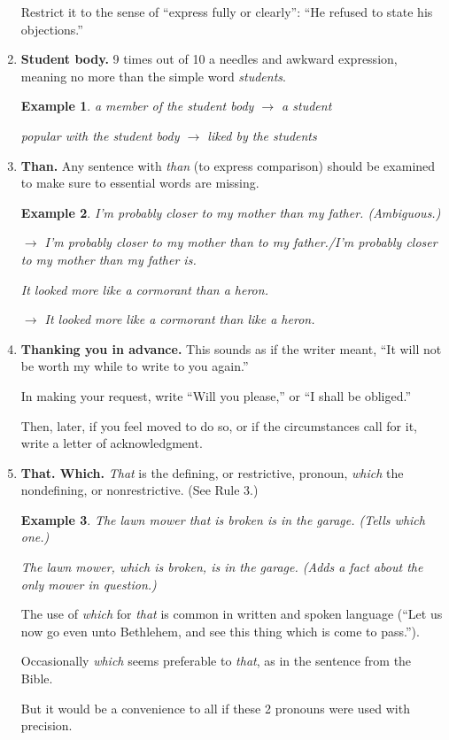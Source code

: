 \documentclass{article}
\newtheorem{example}{Example}
\begin{document}
\begin{enumerate}
	Restrict it to the sense of ``express fully or clearly'': ``He refused to state his objections.''
	\item {\bf Student body.} 9 times out of 10 a needles and awkward expression, meaning no more than the simple word {\it students}.
	\begin{example}
		a member of the student body $\to$ a student
		
		popular with the student body $\to$ liked by the students
	\end{example}
	\item {\bf Than.} Any sentence with {\it than} (to express comparison) should be examined to make sure to essential words are missing.
	\begin{example}
		I'm probably closer to my mother than my father. (Ambiguous.)
		
		$\to$ I'm probably closer to my mother than to my father./I'm probably closer to my mother than my father is.
		
		It looked more like a cormorant than a heron.
		
		$\to$ It looked more like a cormorant than like a heron.
	\end{example}
	\item {\bf Thanking you in advance.} This sounds as if the writer meant, ``It will not be worth my while to write to you again.''
	
	In making your request, write ``Will you please,'' or ``I shall be obliged.''
	
	Then, later, if you feel moved to do so, or if the circumstances call for it, write a letter of acknowledgment.
	\item {\bf That. Which.} {\it That} is the defining, or restrictive, pronoun, {\it which} the nondefining, or nonrestrictive. (See Rule 3.)
	\begin{example}
		The lawn mower that is broken is in the garage. (Tells which one.)
		
		The lawn mower, which is broken, is in the garage. (Adds a fact about the only mower in question.)
	\end{example}
	The use of {\it which} for {\it that} is common in written and spoken language (``Let us now go even unto Bethlehem, and see this thing which is come to pass.'').
	
	Occasionally {\it which} seems preferable to {\it that}, as in the sentence from the Bible.
	
	But it would be a convenience to all if these 2 pronouns were used with precision.
	

\end{enumerate}
\end{document}
